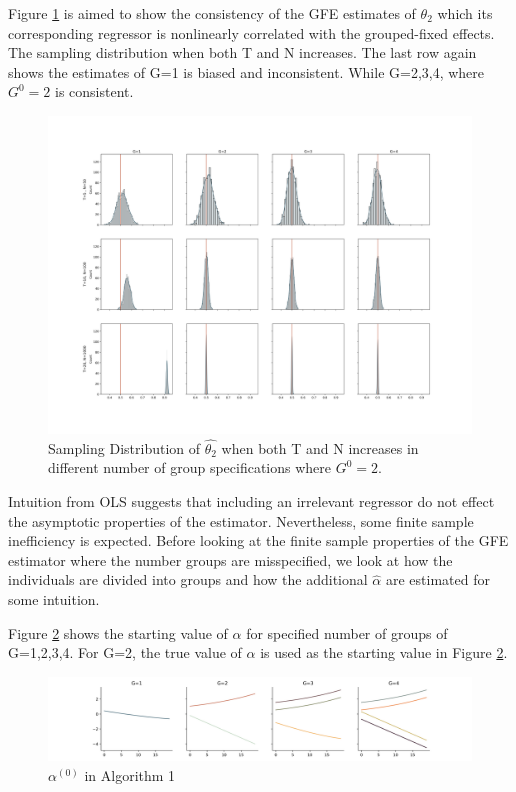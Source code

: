 Figure \ref{fig:gsn} is aimed to show the consistency of the GFE estimates of $\theta_2$ which its corresponding regressor is nonlinearly correlated with the grouped-fixed effects. The sampling distribution when both T and N increases. The last row again shows the estimates of G=1 is biased and inconsistent. While G=2,3,4, where $G^0=2$ is consistent.

\begin{figure}[h]
\begin{flushleft}
\includegraphics[scale=0.31]{figures/groupssamplingplot.png}
\end{flushleft}
\caption{Sampling Distribution of $\hat{\theta_2}$ when both T and N increases in different number of group specifications where $G^0 = 2$.}
\label{fig:gsn}
\end{figure}

Intuition from OLS suggests that including an irrelevant regressor do not effect the asymptotic properties of the estimator. Nevertheless, some finite sample inefficiency is expected. Before looking at the finite sample properties of the GFE estimator where the number groups are misspecified, we look at how the individuals are divided into groups and how the additional $\hat{\alpha}$ are estimated for some intuition.

Figure \ref{fig:staringalphas} shows the starting value of $\alpha$ for specified number of groups of G=1,2,3,4. For G=2, the true value of $\alpha$ is used as the starting value in Figure \ref{fig:staringalphas}.

\begin{figure}[h!]
\centering
\includegraphics[scale=0.4]{figures/startingvalues.png}
\caption{$\alpha^{(0)}$ in Algorithm 1}
\label{fig:staringalphas}
\end{figure}

